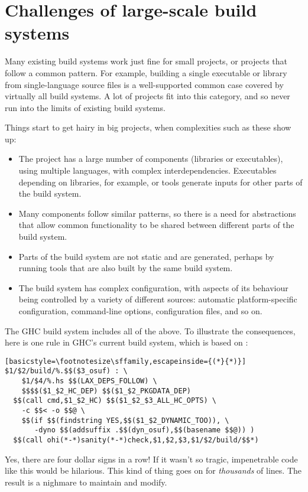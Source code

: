 \section{Challenges of large-scale build systems\label{sec:challenges}}

Many existing build systems work just fine for small projects, or
projects that follow a common pattern.  For example, building a single
executable or library from single-language source files is a
well-supported common case covered by virtually all build systems.  A
lot of projects fit into this category, and so never run into the
limits of existing build systems.

Things start to get hairy in big projects, when complexities such as these
show up:
\begin{itemize}
\item The project has a large number of components (libraries or
  executables), using multiple languages, with complex
  interdependencies.  Executables depending on libraries, for example,
  or tools generate inputs for other parts of the build system.
\item Many components follow similar patterns, so there is a need for
  abstractions that allow common functionality to be shared between
  different parts of the build system.
\item Parts of the build system are not static and are generated,
  perhaps by running tools that are also built by the same build
  system.
\item The build system has complex configuration, with aspects of its
  behaviour being controlled by a variety of different sources:
  automatic platform-specific configuration, command-line options,
  configuration files, and so on.
\end{itemize}
The GHC build system includes all of the above. To illustrate the
consequences, here is one rule in GHC's current build system, which
is based on \make{}:
\begin{lstlisting}[basicstyle=\footnotesize\sffamily,escapeinside={(*}{*)}]
$1/$2/build/%.$$($3_osuf) : \
    $1/$4/%.hs $$(LAX_DEPS_FOLLOW) \
    $$$$($1_$2_HC_DEP) $$($1_$2_PKGDATA_DEP)
  $$(call cmd,$1_$2_HC) $$($1_$2_$3_ALL_HC_OPTS) \
    -c $$< -o $$@ \
    $$(if $$(findstring YES,$$($1_$2_DYNAMIC_TOO)), \
       -dyno $$(addsuffix .$$(dyn_osuf),$$(basename $$@)) )
  $$(call ohi(*-*)sanity(*-*)check,$1,$2,$3,$1/$2/build/$$*)
\end{lstlisting}
Yes, there are four dollar signs in a row!  If it wasn't so tragic,
impenetrable code like this would be hilarious.  This kind of thing
goes on for \emph{thousands} of lines.  The result is a nighmare to
maintain and modify.

